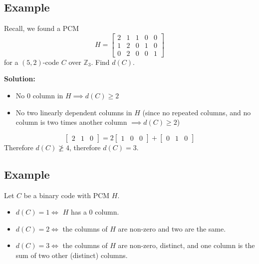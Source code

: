 \begin{exbox}
    \subsection{Example}
    Recall, we found a PCM
    \[ H=
    \left[\begin{array}{cc|ccc}
        2 & 1 & 1 & 0 & 0\\
        1 & 2 & 0 & 1 & 0\\
        0 & 2 & 0 & 0 & 1
    \end{array}\right] \]
    for a $ (5,2) $-code $ C $ over $ \mathbb{Z}_3 $. Find $ d(C) $.

    \textbf{Solution:}
    \begin{itemize}
        \item No $ 0 $ column in $ H\implies d(C)\geqslant 2 $
        \item No two linearly dependent columns in $ H $ (since
        no repeated columns, and no column is two times another
        column $ \implies d(C)\geqslant 2 $)
    \end{itemize}
    \[ \begin{bmatrix} 2 & 1 & 0 \end{bmatrix}
        = 2\begin{bmatrix} 1 & 0 & 0 \end{bmatrix} 
        + \begin{bmatrix} 0 & 1 & 0 \end{bmatrix} \]
    Therefore $ d(C)\ngeqslant 4 $, therefore $ d(C)=3 $.
\end{exbox}

\begin{exbox}
    \subsection{Example}
    Let $ C $ be a binary code with PCM $ H $.
    \begin{itemize}
        \item $ d(C)=1\iff  $ $ H $ has a $ 0 $ column.
        \item $ d(C)=2\iff $ the columns of $ H $ are non-zero and two are
        the same.
        \item $ d(C)=3\iff $ the columns of $ H $ are non-zero, distinct, and one
        column is the sum of two other (distinct) columns.
    \end{itemize}
\end{exbox}

